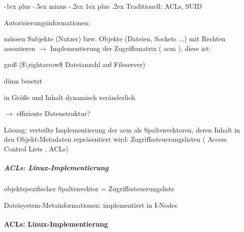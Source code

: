 \documentclass[a4paper]{article}
\makeatletter
\renewcommand{\subsubsection}{\@startsection{subsubsection}{3}{0mm}%
 {-1ex plus -.5ex minus -.2ex}%
 {1ex plus .2ex}%
 {\normalfont\small\bfseries}}
\makeatother
\begin{document}
\begin{multicols}{3}
    \subsubsection{Traditionell: ACLs, SUID}

    Autorisierungsinformationen:

    \begin{itemize*}
        \item
        müssen Subjekte (Nutzer) bzw. Objekte (Dateien, Sockets ...) mit
        Rechten assoziieren $\rightarrow$  Implementierung der
        Zugriffsmatrix ( acm ), diese ist:
        \begin{itemize*}
            \item groß (\$\textbackslash rightarrow\$ Dateianzahl auf Fileserver)
            \item dünn besetzt
            \item in Größe und Inhalt dynamisch veränderlich
            \item $\rightarrow$  effiziente Datenstruktur?
        \end{itemize*}
        \item
        Lösung: verteilte Implementierung der acm als Spaltenvektoren, deren
        Inhalt in den Objekt-Metadaten repräsentiert wird:
        Zugriffssteuerungslisten ( Access Control Lists , ACLs)
    \end{itemize*}


    \subparagraph{ACLs:
        Linux-Implementierung}

    \begin{itemize*}
        \item
        objektspezifischer Spaltenvektor = Zugriffssteuerungsliste
        \item
        Dateisystem-Metainformationen: implementiert in I-Nodes
    \end{itemize*}



    \paragraph{ACLs:
        Linux-Implementierung}


\end{multicols}
\end{document}
